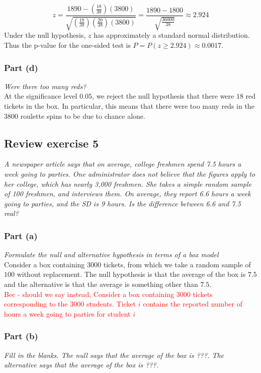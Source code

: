 \documentclass[11pt]{article}
\begin{document}
$$z = \frac{1890 - (\frac{18}{38})(3800)}{\sqrt{ (\frac{18}{38}) (\frac{20}{38})(3800)}} = \frac{1890 - 1800}{\sqrt{\frac{36000}{38}}} \approx 2.924$$
Under the null hypothesis, $z$ has approximately a standard normal distribution.  Thus the p-value for the one-sided test is $P = P(z \geq 2.924) \approx 0.0017$.  
\subsubsection*{Part (d)}
\noindent \emph{Were there too many reds?}\\

\noindent At the significance level $0.05$, we reject the null hypothesis that there were $18$ red tickets in the box.  In particular, this means that there were too many reds in the $3800$ roulette spins to be due to chance alone.

\subsection*{Review exercise 5} %
\noindent \emph{A newspaper article says that on average, college freshmen spend 7.5 hours a week going to parties. One administrator does not believe that the figures apply to her college, which has nearly 3,000 freshmen. She takes a simple random sample of 100 freshmen, and interviews them. On average, they report 6.6 hours a week going to parties, and the SD is 9 hours. Is the difference between 6.6 and 7.5 real?}
\subsubsection*{Part (a)}
\noindent \emph{Formulate the null and alternative hypothesis in terms of a box model}\\

\noindent Consider a box containing $3000$ tickets, from which we take a random sample of $100$ without replacement.  The null hypothesis is that the average of the box is $7.5$ and the alternative is that the average is something other than $7.5$.\\
\textcolor{red}{Bec - should we say instead, Consider a box containing $3000$ tickets corresponding to the 3000 students. Ticket $i$ contains the reported number of hours a week going to parties for student $i$}
\subsubsection*{Part (b)}
\noindent \emph{Fill in the blanks. The null says that the average of the box is ???. The alternative says that the average of the box is ???.}\\
\end{document}
